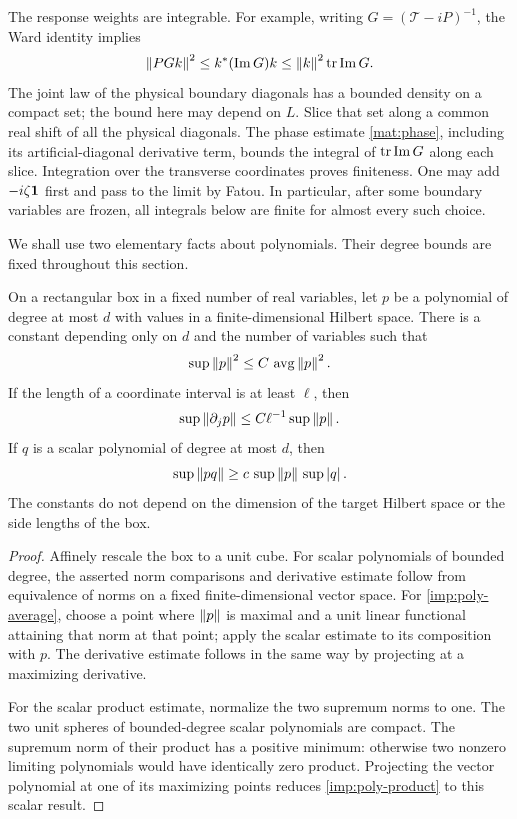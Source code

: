 The response weights are integrable. For example, writing
$G=(\mathcal T-iP)^{-1}$, the Ward identity implies
\[
 \left\lVert PGk\right\rVert^2\le k^*(\operatorname{Im}G)k
 \le \left\lVert k\right\rVert^2\operatorname{tr}\operatorname{Im}G.
\]
The joint law of the physical boundary diagonals has a bounded density on
a compact set; the bound here may depend on $L$. Slice that set along a
common real shift of all the physical diagonals. The phase estimate
\cref{mat:phase}, including its artificial-diagonal derivative term,
bounds the integral of $\operatorname{tr}\operatorname{Im}G$ along each slice. Integration
over the transverse coordinates proves finiteness. One may add
$-i\zeta\mathbf 1$ first and pass to the limit by Fatou. In particular, after
some boundary variables are frozen, all integrals below are finite for
almost every such choice.

We shall use two elementary facts about polynomials. Their degree bounds
are fixed throughout this section.

\begin{lemma}
\label{imp:polynomials}
On a rectangular box in a fixed number of real variables, let $p$ be a
polynomial of degree at most $d$ with values in a finite-dimensional
Hilbert space. There is a constant depending only on $d$ and the number
of variables such that
\begin{equation}
 \sup\left\lVert p\right\rVert^2\le C\,\mathop{\mathrm{avg}}\left\lVert p\right\rVert^2.
 \label{imp:poly-average}
\end{equation}
If the length of a coordinate interval is at least $\ell$, then
\begin{equation}
 \sup\left\lVert\partial_jp\right\rVert\le C\ell^{-1}\sup\left\lVert p\right\rVert.
 \label{imp:poly-derivative}
\end{equation}
If $q$ is a scalar polynomial of degree at most $d$, then
\begin{equation}
 \sup\left\lVert pq\right\rVert\ge c\,\sup\left\lVert p\right\rVert\,\sup\left\lvert q\right\rvert.
 \label{imp:poly-product}
\end{equation}
The constants do not depend on the dimension of the target Hilbert space
or the side lengths of the box.
\end{lemma}

\begin{proof}
Affinely rescale the box to a unit cube. For scalar polynomials of bounded
degree, the asserted norm comparisons and derivative estimate follow
from equivalence of norms on a fixed finite-dimensional vector space.
For \cref{imp:poly-average}, choose a point where $\left\lVert p\right\rVert$ is maximal
and a unit linear functional attaining that norm at that point; apply
the scalar estimate to its composition with $p$. The derivative estimate
follows in the same way by projecting at a maximizing derivative.

For the scalar product estimate, normalize the two supremum norms to
one. The two unit spheres of bounded-degree scalar polynomials are
compact. The supremum norm of their product has a positive minimum:
otherwise two nonzero limiting polynomials would have identically zero
product. Projecting the vector polynomial at one of its maximizing
points reduces \cref{imp:poly-product} to this scalar result.
\end{proof}

